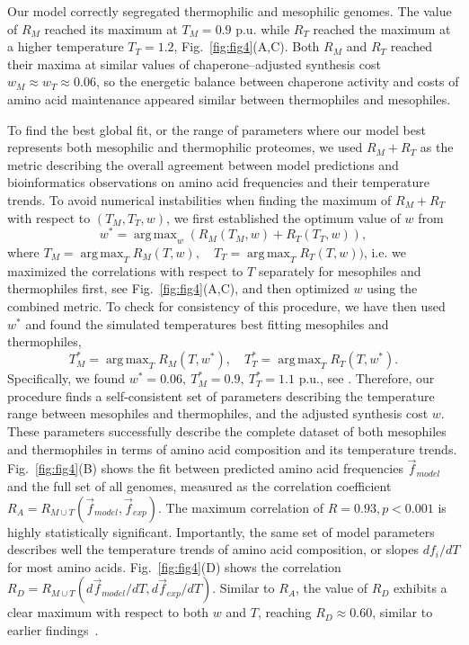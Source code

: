 \documentclass[10pt,letterpaper]{article}
\DeclareMathOperator*{\argmax}{arg\,max}
\begin{document}
Our model correctly segregated thermophilic and mesophilic genomes. The value of $R_M$ reached its maximum at $T_M=0.9$ p.u. while $R_T$ reached the maximum at a higher temperature $T_T=1.2$, Fig.~\ref{fig:fig4}(A,C). Both $R_M$ and $R_T$ reached their maxima at similar values of chaperone--adjusted synthesis cost $w_M\approx w_T \approx 0.06$, so the energetic balance between chaperone activity and costs of amino acid maintenance appeared similar between thermophiles and mesophiles.

To find the best global fit, or the range of parameters where our model best represents both mesophilic and thermophilic proteomes, we used $R_M + R_T$ as the metric describing the overall agreement between model predictions and bioinformatics observations on amino acid frequencies and their temperature trends. To avoid numerical instabilities when finding the maximum of $R_M+R_T$ with respect to $(T_M, T_T, w)$, we first established the optimum value of $w$ from
\begin{equation}
	\label{optimal_w_definition}
	w^* = \argmax_{w} ( R_M(T_M, w) + R_T(T_T,w) ),
\end{equation}
where $T_M=\argmax_{T}R_M(T,w), \quad T_T=\argmax_{T}R_T(T,w))$, i.e. we maximized the correlations with respect to $T$ separately for mesophiles and thermophiles first, see Fig.~\ref{fig:fig4}(A,C), and then optimized $w$ using the combined metric. To check for consistency of this procedure, we have then used $w^*$ and found the simulated temperatures best fitting mesophiles and thermophiles, 
\begin{equation}
	\label{optimal_T_range}
	T^*_M = \argmax_{T}R_M(T, w^*), \quad T^*_T = \argmax_{T}R_T(T, w^*).
\end{equation}
Specifically, we found $w^*=0.06,\  T^*_M=0.9,\ T^*_T=1.1$ p.u., see . Therefore, our procedure finds a self-consistent set of parameters describing the temperature range between mesophiles and thermophiles, and the adjusted synthesis cost $w$. These parameters successfully describe the complete dataset of both mesophiles and thermophiles in terms of amino acid composition and its temperature trends. Fig.~\ref{fig:fig4}(B) shows the fit between predicted amino acid frequencies $\vec f_{model}$ and the full set of all genomes, measured as the correlation coefficient $R_A = R_{M \cup T}(\vec f_{model}, \vec f_{exp})$. The maximum correlation of $R=0.93, p<0.001$ is highly statistically significant. Importantly, the same set of model parameters describes well the temperature trends of amino acid composition, or slopes $df_i/dT$ for most amino acids. Fig.~\ref{fig:fig4}(D) shows the correlation $R_D = R_{M\cup T}(d\vec f_{model}{/dT}, d\vec f_{exp}/dT)$. Similar to $R_A$, the value of $R_D$ exhibits a clear maximum with respect to both $w$ and $T$, reaching $R_D\approx0.60$, similar to earlier findings~\cite{Venev2015Massively}.
\end{document}
